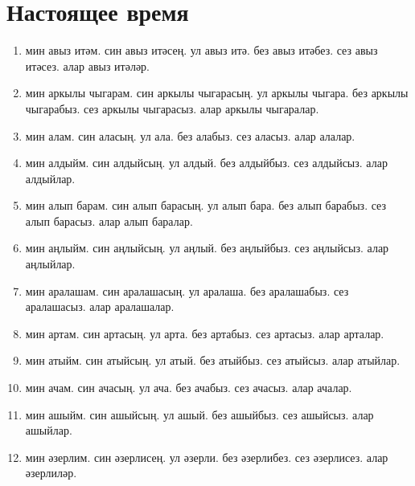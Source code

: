 \documentclass{article}
\begin{document}
\section{Настоящее время}
\begin{enumerate}
    \item
    мин авыз итәм.
    син авыз итәсең.
    ул авыз итә.
    без авыз итәбез.
    сез авыз итәсез.
    алар авыз итәләр.

    \item
    мин аркылы чыгарам.
    син аркылы чыгарасың.
    ул аркылы чыгара.
    без аркылы чыгарабыз.
    сез аркылы чыгарасыз.
    алар аркылы чыгаралар.

    \item
    мин алам.
    син аласың.
    ул ала.
    без алабыз.
    сез аласыз.
    алар алалар.

    \item
    мин алдыйм.
    син алдыйсың.
    ул алдый.
    без алдыйбыз.
    сез алдыйсыз.
    алар алдыйлар.

    \item
    мин алып барам.
    син алып барасың.
    ул алып бара.
    без алып барабыз.
    сез алып барасыз.
    алар алып баралар.

    \item
    мин аңлыйм.
    син аңлыйсың.
    ул аңлый.
    без аңлыйбыз.
    сез аңлыйсыз.
    алар аңлыйлар.

    \item
    мин аралашам.
    син аралашасың.
    ул аралаша.
    без аралашабыз.
    сез аралашасыз.
    алар аралашалар.

    \item
    мин артам.
    син артасың.
    ул арта.
    без артабыз.
    сез артасыз.
    алар арталар.

    \item
    мин атыйм.
    син атыйсың.
    ул атый.
    без атыйбыз.
    сез атыйсыз.
    алар атыйлар.

    \item
    мин ачам.
    син ачасың.
    ул ача.
    без ачабыз.
    сез ачасыз.
    алар ачалар.

    \item
    мин ашыйм.
    син ашыйсың.
    ул ашый.
    без ашыйбыз.
    сез ашыйсыз.
    алар ашыйлар.

    \item
    мин әзерлим.
    син әзерлисең.
    ул әзерли.
    без әзерлибез.
    сез әзерлисез.
    алар әзерлиләр.


\end{enumerate}
\end{document}
